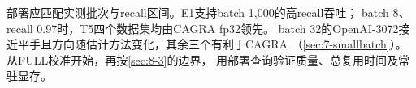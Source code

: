 部署应匹配实测批次与recall区间。E1支持batch 1,000的高recall吞吐；
batch 8、recall 0.97时，T5四个数据集均由CAGRA fp32领先。
batch 32的OpenAI-3072接近平手且方向随估计方法变化，其余三个有利于CAGRA
（\cref{sec:7-smallbatch}）。从FULL校准开始，再按\cref{sec:8-3}的边界，
用部署查询验证质量、总复用时间及常驻显存。
